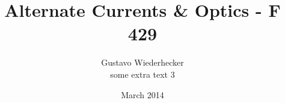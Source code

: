 \title[]{Alternate Currents \& Optics - F 429}

\author[Gustavo Wiederhecker]{
Gustavo Wiederhecker\\
\vspace{10pt}
some extra text 3
}
\date{March 2014}